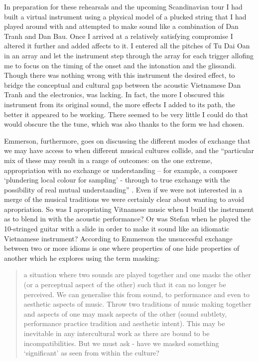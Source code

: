 \documentclass[a4paper]{article}
\begin{document}
In preparation for these rehearsals and the upcoming Scandinavian tour I had built a virtual instrument using a physical model of a plucked string that I had played around with and attempted to make sound like a combination of Dan Tranh and Dan Bau. Once I arrived at a relatively satisfying compromise I altered it further and added affects to it. I entered all the pitches of Tu Dai Oan in an array and let the instrument step through the array for each trigger allofing me to focus on the timing of the onset and the intonation and the glissandi. Though there was nothing wrong with this instrument the desired effect, to bridge the conceptual and cultural gap between the acoustic Vietnamese Dan Tranh and the electronics, was lacking. In fact, the more I obscured this instrument from its original sound, the more effects I added to its path, the better it appeared to be working. There seemed to be very little I could do that would obscure the the tune, which was also thanks to the form we had chosen.

Emmerson, furthermore, goes on discussing the different modes of exchange that we may have access to when different musical cultures collide, and the ``particular mix of these may result in a range of outcomes: on the one extreme, appropriation with no exchange or understanding – for example, a composer ‘plundering local colour for sampling’ - through to true exchange with the possibility of real mutual understanding'' \citep{emmerson06}. Even if we were not interested in a merge of the musical traditions we were certainly clear about wanting to avoid apropriation. So was I apropriating Vitnamese music when I build the instrument as to blend in with the acoustic performance? Or was Stefan when he played the 10-stringed guitar with a slide in order to make it sound like an idiomatic Vietnamese instrument? According to Emmerson the unsuccesful exchange between two or more idioms is one where properties of one hide properties of another which he explores using the term masking:

\begin{quote}
  a situation where two sounds are played together and one masks the other (or a perceptual aspect of the other) such that it can no longer be perceived. We can generalise this from sound, to performance and even to aesthetic aspects of music. Throw two traditions of music making together and aspects of one may mask aspects of the other (sound subtlety, performance practice tradition and aesthetic intent). This may be inevitable in any intercultural work as there are bound to be incompatibilities. But we must ask - have we masked something ‘significant’ as seen from within the culture? \citep{emmerson06}
\end{quote}
\end{document}
